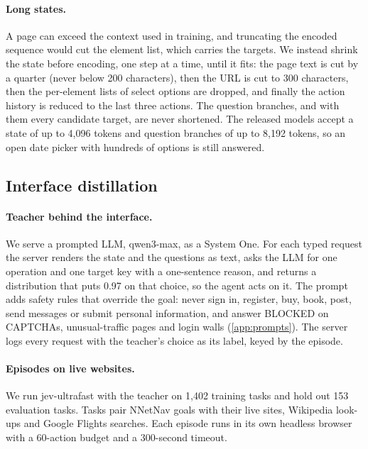 \documentclass{article}
\begin{document}
\paragraph{Long states.} A page can exceed the context used in training, and truncating the encoded sequence would cut
the element list, which carries the targets. We instead shrink the state before encoding, one step at a time, until it
fits: the page text is cut by a quarter (never below 200 characters), then the URL is cut to 300 characters, then the
per-element lists of select options are dropped, and finally the action history is reduced to the last three actions.
The question branches, and with them every candidate target, are never shortened. The released models accept a state
of up to 4{,}096 tokens and question branches of up to 8{,}192 tokens, so an open date picker with hundreds of options
is still answered.

\subsection{Interface distillation}
\label{sec:distill}

\paragraph{Teacher behind the interface.} We serve a prompted LLM, qwen3-max, as a System One. For each typed request
the server renders the state and the questions as text, asks the LLM for one operation and one target key with a
one-sentence reason, and returns a distribution that puts 0.97 on that choice, so the agent acts on it. The prompt adds
safety rules that override the goal: never sign in, register, buy, book, post, send messages or submit personal
information, and answer BLOCKED on CAPTCHAs, unusual-traffic pages and login walls (\cref{app:prompts}). The server
logs every request with the teacher's choice as its label, keyed by the episode.

\paragraph{Episodes on live websites.} We run jev-ultrafast with the teacher on 1{,}402 training tasks and hold out 153
evaluation tasks. Tasks pair NNetNav goals with their live sites, Wikipedia look-ups and Google Flights searches. Each
episode runs in its own headless browser with a 60-action budget and a 300-second timeout.
\end{document}
